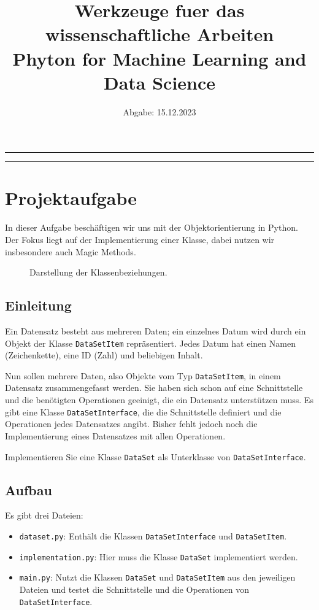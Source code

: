\documentclass[12pt
a4paper,
parskip=full ]{article}
\title{\textbf{Werkzeuge fuer das wissenschaftliche Arbeiten}\\ Phyton for Machine Learning and Data Science}
\author{}
\date{Abgabe: 15.12.2023}
\begin{document}
\maketitle
\hrule
\vspace{1cm}

\tableofcontents
\vspace{1cm}
\hrule

\section{Projektaufgabe}
In dieser Aufgabe besch\"aftigen wir uns mit der Objektorientierung in Python. Der Fokus liegt auf der Implementierung einer Klasse, dabei nutzen wir insbesondere auch Magic Methods.

\begin{figure}[h!]
    \centering
    
    \caption{Darstellung der Klassenbeziehungen.}
    \label{fig:classes}
\end{figure}



\subsection{Einleitung}
Ein Datensatz besteht aus mehreren Daten; ein einzelnes Datum wird durch ein Objekt der Klasse \texttt{DataSetItem} repr\"asentiert. Jedes Datum hat einen Namen (Zeichenkette), eine ID (Zahl) und beliebigen Inhalt.

Nun sollen mehrere Daten, also Objekte vom Typ \texttt{DataSetItem}, in einem Datensatz zusammengefasst werden. Sie haben sich schon auf eine Schnittstelle und die ben\"otigten Operationen geeinigt, die ein Datensatz unterst\"utzen muss. Es gibt eine Klasse \texttt{DataSetInterface}, die die Schnittstelle definiert und die Operationen jedes Datensatzes angibt. Bisher fehlt jedoch noch die Implementierung eines Datensatzes mit allen Operationen.

Implementieren Sie eine Klasse \texttt{DataSet} als Unterklasse von \texttt{DataSetInterface}.

\subsection{Aufbau}
Es gibt drei Dateien:
\begin{itemize}
    \item \texttt{dataset.py}: Enth\"alt die Klassen \texttt{DataSetInterface} und \texttt{DataSetItem}.
    \item \texttt{implementation.py}: Hier muss die Klasse \texttt{DataSet} implementiert werden.
    \item \texttt{main.py}: Nutzt die Klassen \texttt{DataSet} und \texttt{DataSetItem} aus den jeweiligen Dateien und testet die Schnittstelle und die Operationen von \texttt{DataSetInterface}.
\end{itemize}
\end{document}
